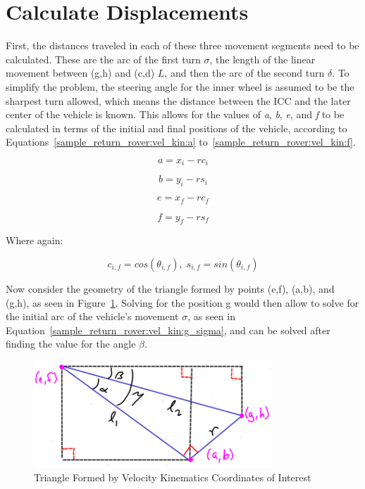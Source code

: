 \section{Calculate Displacements}
First, the distances traveled in each of these three movement segments need to be calculated. These are the arc of the first turn $\sigma$, the length of the linear movement between (g,h) and (c,d) $L$, and then the arc of the second turn $\delta$. To simplify the problem, the steering angle for the inner wheel is assumed to be the sharpest turn allowed, which means the distance between the \ac{ICC} and the later center of the vehicle is known. This allows for the values of \textit{a}, \textit{b}, \textit{e}, and \textit{f} to be calculated in terms of the initial and final positions of the vehicle, according to Equations~\ref{sample_return_rover:vel_kin:a} to~\ref{sample_return_rover:vel_kin:f}.

\begin{equation}\label{sample_return_rover:vel_kin:a}
	a = x_{i} - rc_{i}
\end{equation}

\begin{equation}\label{sample_return_rover:vel_kin:b}
	b = y_{i} - rs_{i}
\end{equation}

\begin{equation}\label{sample_return_rover:vel_kin:e}
	e = x_{f} - rc_{f}
\end{equation}

\begin{equation}\label{sample_return_rover:vel_kin:f}
	f = y_{f} - rs_{f}
\end{equation}

Where again:

\begin{equation}\label{sample_return_rover:vel_kin:csif}
	c_{i,f} = cos(\theta_{i,f}), \; s_{i,f} = sin(\theta_{i,f})
\end{equation}

Now consider the geometry of the triangle formed by points (e,f), (a,b), and (g,h), as seen in Figure~\ref{sample_return_rover:vel_kin:solving_g}. Solving for the position g would then allow to solve for the initial arc of the vehicle's movement $\sigma$, as seen in Equation~\ref{sample_return_rover:vel_kin:g_sigma}, and can be solved after finding the value for the angle $\beta$.

\begin{figure}[H]
	\centering
	\includegraphics[width=0.8\textwidth]{sections/robot-design/images/vel_kin_solving_g.png}
	\caption{Triangle Formed by Velocity Kinematics Coordinates of Interest}
	\label{sample_return_rover:vel_kin:solving_g}
\end{figure}


